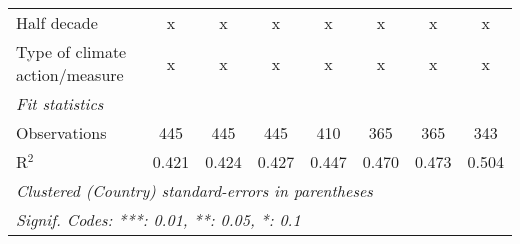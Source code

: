 \begin{tabular}{lccccccc}
   Half decade                                                                            & x            & x            & x            & x           & x           & x            & x\\  
   Type of climate action/measure                                                         & x            & x            & x            & x           & x           & x            & x\\  
   \midrule \emph{Fit statistics}\\
   Observations                                                                           & 445          & 445          & 445          & 410         & 365         & 365          & 343\\  
   R$^2$                                                                                  & 0.421        & 0.424        & 0.427        & 0.447       & 0.470       & 0.473        & 0.504\\  
   \midrule
   \multicolumn{8}{l}{\emph{Clustered (Country) standard-errors in parentheses}}\\
   \multicolumn{8}{l}{\emph{Signif. Codes: ***: 0.01, **: 0.05, *: 0.1}}\\
\end{tabular}
\par\endgroup


